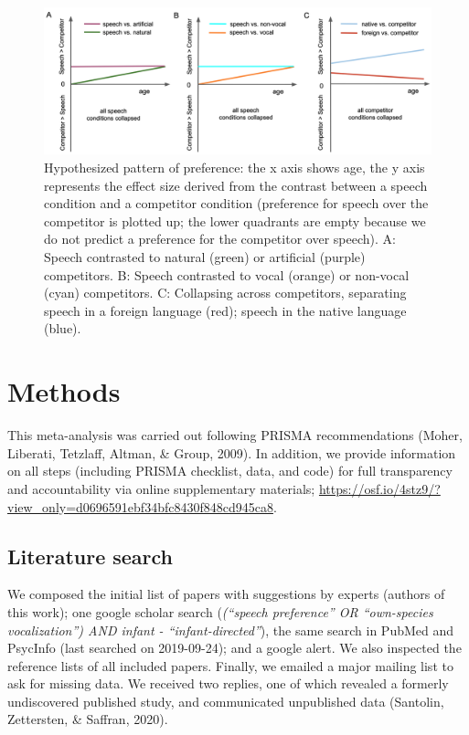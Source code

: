 \documentclass[
  english,
  man]{apa6}
\begin{document}
\begin{figure}
\includegraphics[width=6.63in]{figures_intro/hypotheses} \caption{Hypothesized pattern of preference: the x axis shows age, the y axis represents the effect size derived from the contrast between a speech condition and a competitor condition (preference for speech over the competitor is plotted up; the lower quadrants are empty because we do not predict a preference for the competitor over speech). A: Speech contrasted to natural (green) or artificial (purple) competitors. B: Speech contrasted to vocal (orange) or non-vocal (cyan) competitors. C: Collapsing across competitors, separating speech in a foreign language (red); speech in the native language (blue).}\label{fig:hyp}
\end{figure}

\hypertarget{methods}{%
\section{Methods}\label{methods}}

This meta-analysis was carried out following PRISMA recommendations (Moher, Liberati, Tetzlaff, Altman, \& Group, 2009). In addition, we provide information on all steps (including PRISMA checklist, data, and code) for full transparency and accountability via online supplementary materials; \url{https://osf.io/4stz9/?view_only=d0696591ebf34bfc8430f848cd945ca8}.

\hypertarget{literature-search}{%
\subsection{Literature search}\label{literature-search}}

We composed the initial list of papers with suggestions by experts (authors of this work); one google scholar search (\emph{(\enquote{speech preference} OR \enquote{own-species vocalization}) AND infant - \enquote{infant-directed}}), the same search in PubMed and PsycInfo (last searched on 2019-09-24); and a google alert. We also inspected the reference lists of all included papers. Finally, we emailed a major mailing list to ask for missing data. We received two replies, one of which revealed a formerly undiscovered published study, and communicated unpublished data (Santolin, Zettersten, \& Saffran, 2020).
\end{document}
